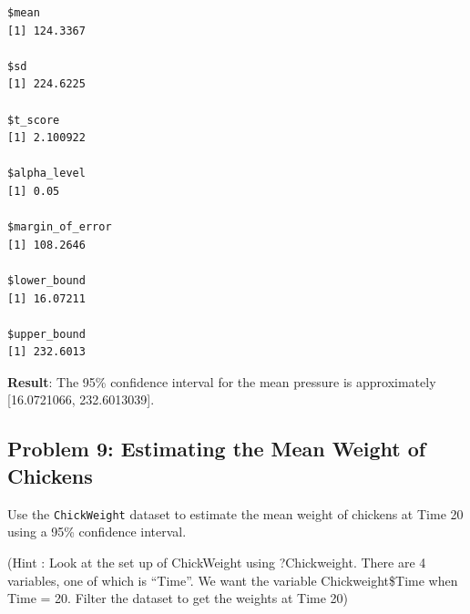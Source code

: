 \documentclass[
  letterpaper,
  DIV=11,
  numbers=noendperiod]{scrreprt}
\begin{document}
\begin{verbatim}
$mean
[1] 124.3367

$sd
[1] 224.6225

$t_score
[1] 2.100922

$alpha_level
[1] 0.05

$margin_of_error
[1] 108.2646

$lower_bound
[1] 16.07211

$upper_bound
[1] 232.6013
\end{verbatim}

\textbf{Result}: The 95\% confidence interval for the mean pressure is
approximately {[}16.0721066, 232.6013039{]}.

\subsection*{Problem 9: Estimating the Mean Weight of
Chickens}\label{problem-9-estimating-the-mean-weight-of-chickens}

Use the \texttt{ChickWeight} dataset to estimate the mean weight of
chickens at Time 20 using a 95\% confidence interval.

(Hint : Look at the set up of ChickWeight using ?Chickweight. There are
4 variables, one of which is ``Time''. We want the variable
Chickweight\$Time when Time = 20. Filter the dataset to get the weights
at Time 20)
\end{document}
